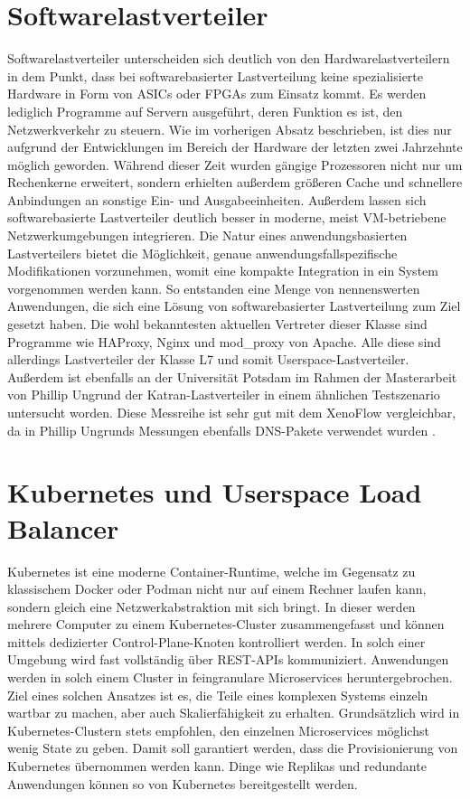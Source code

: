 \section{Softwarelastverteiler}
Softwarelastverteiler unterscheiden sich deutlich von den Hardwarelastverteilern in dem Punkt, dass bei softwarebasierter Lastverteilung keine spezialisierte Hardware in Form von ASICs oder FPGAs zum Einsatz kommt. Es werden lediglich Programme auf Servern ausgeführt, deren Funktion es ist, den Netzwerkverkehr zu steuern. Wie im vorherigen Absatz beschrieben, ist dies nur aufgrund der Entwicklungen im Bereich der Hardware der letzten zwei Jahrzehnte möglich geworden. Während dieser Zeit wurden gängige Prozessoren nicht nur um Rechenkerne erweitert, sondern erhielten außerdem größeren Cache und schnellere Anbindungen an sonstige Ein- und Ausgabeeinheiten. Außerdem lassen sich softwarebasierte Lastverteiler deutlich besser in moderne, meist VM-betriebene Netzwerkumgebungen integrieren. Die Natur eines anwendungsbasierten Lastverteilers bietet die Möglichkeit, genaue anwendungsfallspezifische Modifikationen vorzunehmen, womit eine kompakte Integration in ein System vorgenommen werden kann. \cite{softwarelb} So entstanden eine Menge von nennenswerten Anwendungen, die sich eine Lösung von softwarebasierter Lastverteilung zum Ziel gesetzt haben. Die wohl bekanntesten aktuellen Vertreter dieser Klasse sind Programme wie HAProxy, Nginx und mod\_proxy von Apache. \cite{soni2016load} Alle diese sind allerdings Lastverteiler der Klasse L7 und somit Userspace-Lastverteiler. Außerdem ist ebenfalls an der Universität Potsdam im Rahmen der Masterarbeit von Phillip Ungrund der Katran-Lastverteiler in einem ähnlichen Testszenario untersucht worden. Diese Messreihe ist sehr gut mit dem XenoFlow vergleichbar, da in Phillip Ungrunds Messungen ebenfalls DNS-Pakete verwendet wurden \cite{ungrund}. 
\section{Kubernetes und Userspace Load Balancer}
Kubernetes ist eine moderne Container-Runtime, welche im Gegensatz zu klassischem Docker oder Podman nicht nur auf einem Rechner laufen kann, sondern gleich eine Netzwerkabstraktion mit sich bringt. In dieser werden mehrere Computer zu einem Kubernetes-Cluster zusammengefasst und können mittels dedizierter Control-Plane-Knoten kontrolliert werden. In solch einer Umgebung wird fast vollständig über REST-APIs kommuniziert. Anwendungen werden in solch einem Cluster in feingranulare Microservices heruntergebrochen. Ziel eines solchen Ansatzes ist es, die Teile eines komplexen Systems einzeln wartbar zu machen, aber auch Skalierfähigkeit zu erhalten. Grundsätzlich wird in Kubernetes-Clustern stets empfohlen, den einzelnen Microservices möglichst wenig State zu geben. Damit soll garantiert werden, dass die Provisionierung von Kubernetes übernommen werden kann. Dinge wie Replikas und redundante Anwendungen können so von Kubernetes bereitgestellt werden. \cite{vasireddy2023kubernetes}

